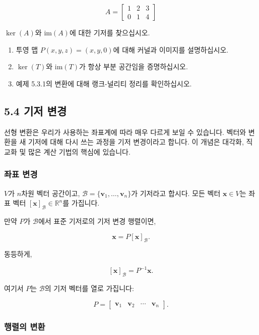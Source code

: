 \documentclass[
  12pt,
  a4paper,
]{article}
\begin{document}
\[A = \begin{bmatrix} 1 & 2 & 3 \\ 0 & 1 & 4 \end{bmatrix}\]

\(\ker(A)\)와 \(\text{im}(A)\)에 대한 기저를 찾으십시오.

\begin{enumerate}
\def\labelenumi{\arabic{enumi}.}
\item
  투영 맵 \(P(x,y,z) = (x,y,0)\)에 대해 커널과 이미지를 설명하십시오.
\item
  \(\ker(T)\)와 \(\text{im}(T)\)가 항상 부분 공간임을 증명하십시오.
\item
  예제 5.3.1의 변환에 대해 랭크-널리티 정리를 확인하십시오.
\end{enumerate}

\subsection{5.4 기저 변경}\label{54-change-of-basis}

선형 변환은 우리가 사용하는 좌표계에 따라 매우 다르게 보일 수 있습니다. 벡터와 변환을 새 기저에 대해 다시 쓰는 과정을 기저 변경이라고 합니다. 이 개념은 대각화, 직교화 및 많은 계산 기법의 핵심에 있습니다.

\subsubsection{좌표 변경}\label{coordinate-change}

\(V\)가 \(n\)차원 벡터 공간이고, \(\mathcal{B} = \{\mathbf{v}_1, \dots, \mathbf{v}_n\}\)가 기저라고 합시다. 모든 벡터 \(\mathbf{x} \in V\)는 좌표 벡터 \([\mathbf{x}]_{\mathcal{B}} \in \mathbb{R}^n\)를 가집니다.

만약 \(P\)가 \(\mathcal{B}\)에서 표준 기저로의 기저 변경 행렬이면,

\[\mathbf{x} = P [\mathbf{x}]_{\mathcal{B}}.\]

동등하게,

\[[\mathbf{x}]_{\mathcal{B}} = P^{-1} \mathbf{x}.\]

여기서 \(P\)는 \(\mathcal{B}\)의 기저 벡터를 열로 가집니다:

\[P = \begin{bmatrix}
\mathbf{v}_1 & \mathbf{v}_2 & \cdots & \mathbf{v}_n
\end{bmatrix}.\]

\subsubsection{행렬의 변환}\label{transformation-of-matrices}
\end{document}
